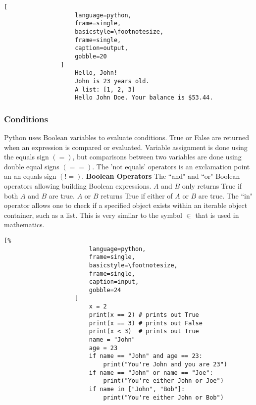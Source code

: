 \documentclass[crop=false,class=article,oneside]{standalone}
\begin{document}
            \begin{minipage}[t]{.48\textwidth}
                \centering
                \begin{lstlisting}[
                    language=python,
                    frame=single,
                    basicstyle=\footnotesize,
                    frame=single,
                    caption=output,
                    gobble=20
                ]
                    Hello, John!
                    John is 23 years old.
                    A list: [1, 2, 3]
                    Hello John Doe. Your balance is $53.44.

                \end{lstlisting}
            \end{minipage}
        \subsubsection{Conditions}
            Python uses Boolean variables to evaluate conditions.
            True or False are returned when an expression is
            compared or evaluated. Variable assignment is done
            using the equals sign $(=)$, but comparisons between
            two variables are done using double equal signs
            $(==)$. The 'not equals' operators is an exclamation
            point an an equals sign $(!=)$.
            \textbf{Boolean Operators}
                The ``and" and ``or" Boolean operators allowing
                building Boolean expressions. $A$ and $B$ only
                returns True if both $A$ and $B$ are true. $A$ or
                $B$ returns True if either of $A$ or $B$ are
                true. The ``in" operator allows one to check if a
                specified object exists within an iterable object
                container, such as a list. This is very similar
                to the symbol $\in$ that is used in
                mathematics.\newline
                \begin{minipage}[t]{0.48\textwidth}
                    \begin{lstlisting}[%
                        language=python,
                        frame=single,
                        basicstyle=\footnotesize,
                        frame=single,
                        caption=input,
                        gobble=24
                    ]
                        x = 2
                        print(x == 2) # prints out True
                        print(x == 3) # prints out False
                        print(x < 3)  # prints out True
                        name = "John"
                        age = 23
                        if name == "John" and age == 23:
                            print("You're John and you are 23")
                        if name == "John" or name == "Joe":
                            print("You're either John or Joe")
                        if name in ["John", "Bob"]:
                            print("You're either John or Bob")
                \end{lstlisting}
                \end{minipage}\hfill
\end{document}
